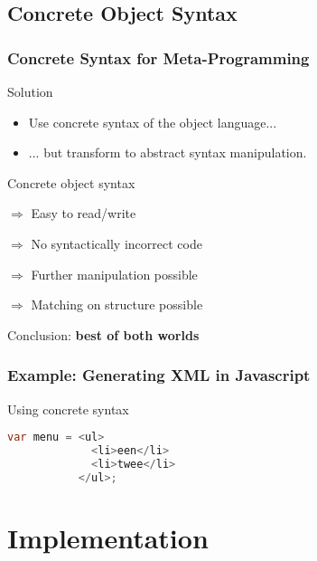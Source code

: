 \documentclass{beamer}
\begin{document}
\subsection{Concrete Object Syntax}

\begin{frame}

  \frametitle{Concrete Syntax for Meta-Programming}

  \begin{block}{Solution}
    \begin{itemize}
      \item Use concrete syntax of the object language...
      \item ... but transform to abstract syntax manipulation.
    \end{itemize}
  \end{block}

  \begin{block}{Concrete object syntax}
    \begin{description}
      \item{\color{darkgreen}$\Rightarrow$} Easy to read/write
      \item{\color{darkgreen}$\Rightarrow$} No syntactically incorrect code
      \item{\color{darkgreen}$\Rightarrow$} Further manipulation possible
      \item{\color{darkgreen}$\Rightarrow$} Matching on structure possible
    \end{description}
    Conclusion: {\bf best of both worlds}
  \end{block}

\end{frame}


\begin{frame}[fragile]

  \frametitle{Example: Generating XML in Javascript}

  \begin{block}{Using concrete syntax}
    \begin{lstlisting}[language=Java]
var menu = <ul>
             <li>een</li>
             <li>twee</li>
           </ul>;
    \end{lstlisting}
  \end{block}

\end{frame}


\section{Implementation}
\end{document}
